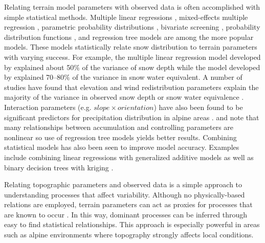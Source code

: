 \documentclass[12pt]{article}
\begin{document}
Relating terrain model parameters with observed data is often accomplished with simple statistical methods. Multiple linear regressions \citep{Marchand2005, Sold2013, McGrath2015}, mixed-effects multiple regression \citep{Kasurak2011}, parametric probability distributions \citep{Clark2011}, bivariate screening \citep{Anderton2004}, probability distribution functions \citep{Kerr2013}, and regression tree models \citep{Elder1998, Winstral2002, Molotch2005, Revuelto2014, Wetlaufer2016} are among the more popular models. These models statistically relate snow distribution to terrain parameters with varying success. For example, the multiple linear regression model developed by \cite{Sold2013} explained about 50$\%$ of the variance of snow depth while the model developed by \cite{Anderton2004} explained 70--80$\%$ of the variance in snow water equivalent. A number of studies have found that elevation and wind redistribution parameters explain the majority of the variance in observed snow depth or snow water equivalence \citep[e.g.][]{Erickson2005, Trujillo2009,Schirmer2011, Grunewald2014, McGrath2015}. Interaction parameters (e.g. $slope \times orientation$) have also been found to be significant predictors for precipitation distribution in alpine areas \citep{Basist1994}. \cite{Erxleben2002} and \cite{Molotch2005} note that many relationships between accumulation and controlling parameters are nonlinear so use of regression tree models yields better results. Combining statistical models has also been seen to improve model accuracy. Examples include combining linear regressions with generalized additive models \citep{Lopez2006} as well as binary decision trees with kriging \citep{Balk2000}. 

Relating topographic parameters and observed data is a simple approach to understanding processes that affect variability. Although no physically-based relations are employed, terrain parameters can act as proxies for processes that are known to occur \citep{McGrath2015}. In this way, dominant processes can be inferred through easy to find statistical relationships. This approach is especially powerful in areas such as alpine environments where topography strongly affects local conditions. 
\end{document}
